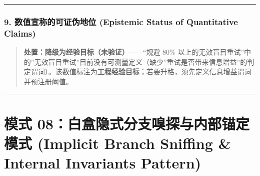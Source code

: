 \begin{Shaded}
\begin{Highlighting}[]
\OperatorTok{=} \NormalTok{(}
\OperatorTok{,}
\OperatorTok{,}
\NormalTok{      )}\OperatorTok{;}

      \NormalTok{) \{}
        \NormalTok{()}\OperatorTok{;}
\NormalTok{      \}}
\NormalTok{    \}}

    \OperatorTok{:} \OperatorTok{,}\OperatorTok{:} \NormalTok{ \}}\OperatorTok{;}
\NormalTok{  \}}
\NormalTok{\}}
\end{Highlighting}
\end{Shaded}

\begin{center}\rule{0.5\linewidth}{0.5pt}\end{center}

\subsubsection{9. 数值宣称的可证伪地位 (Epistemic Status of Quantitative
Claims)}\label{ux6570ux503cux5ba3ux79f0ux7684ux53efux8bc1ux4f2aux5730ux4f4d-epistemic-status-of-quantitative-claims-2}

\begin{quote}
\textbf{处置：降级为经验目标（未验证）}------``规避 80\%
以上的无效盲目重试''中的''无效盲目重试''目前没有可测量定义（缺少''重试是否带来信息增益''的判定谓词）。该数值标注为\textbf{工程经验目标}；若要升格，须先定义信息增益谓词并预注册阈值。
\end{quote}

\begin{center}\rule{0.5\linewidth}{0.5pt}\end{center}

\section{模式 08：白盒隐式分支嗅探与内部锚定模式 (Implicit Branch
Sniffing \& Internal Invariants
Pattern)}\label{ux6a21ux5f0f-08ux767dux76d2ux9690ux5f0fux5206ux652fux55c5ux63a2ux4e0eux5185ux90e8ux951aux5b9aux6a21ux5f0f-implicit-branch-sniffing-internal-invariants-pattern}

